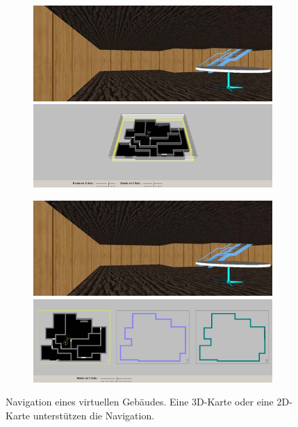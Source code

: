 \begin{figure}
	\centering
	\begin{subfigure}{0.49\textwidth}
		\includegraphics[width=\textwidth]{figures/chittaro2006_ve.png}
		\includegraphics[width=\textwidth]{figures/chittaro2006_3dm.png}
		\caption{}
		\label{sfig:chittaro2006_3dm}
    \end{subfigure}
    \hfill
	\begin{subfigure}{0.49\textwidth}
		\includegraphics[width=\textwidth]{figures/chittaro2006_ve.png}
		\includegraphics[width=\textwidth]{figures/chittaro2006_2dm.png}
		\caption{}
		\label{sfig:chittaro2006_2dm}
	\end{subfigure}
	\caption{Navigation eines virtuellen Gebäudes. Eine 3D-Karte  oder eine 2D-Karte  unterstützen die Navigation. }
	\label{fig:chittaro2006_maps}
\end{figure}

